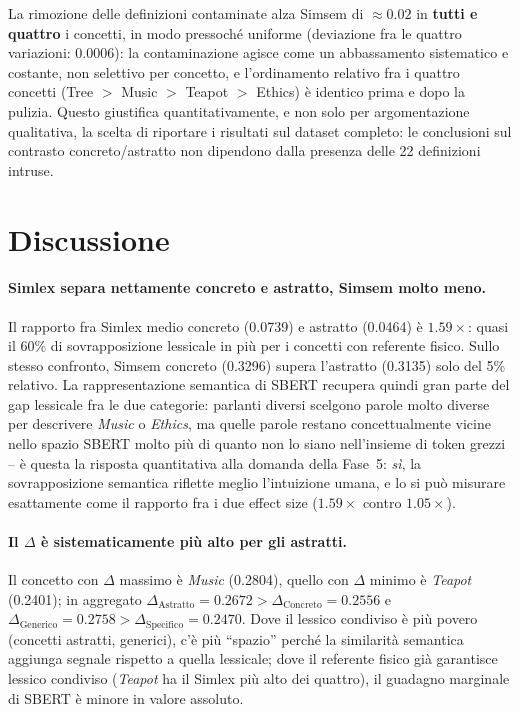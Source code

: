 \documentclass[12pt,a4paper]{article}
\begin{document}
La rimozione delle definizioni contaminate alza Simsem di $\approx 0.02$ in \textbf{tutti e quattro} i concetti, in modo pressoch\'e uniforme (deviazione fra le quattro variazioni: $0.0006$): la contaminazione agisce come un abbassamento sistematico e costante, non selettivo per concetto, e l'ordinamento relativo fra i quattro concetti (Tree $>$ Music $>$ Teapot $>$ Ethics) \`e identico prima e dopo la pulizia. Questo giustifica quantitativamente, e non solo per argomentazione qualitativa, la scelta di riportare i risultati sul dataset completo: le conclusioni sul contrasto concreto/astratto non dipendono dalla presenza delle 22 definizioni intruse.

\section{Discussione}

\paragraph{Simlex separa nettamente concreto e astratto, Simsem molto meno.} Il rapporto fra Simlex medio concreto (0.0739) e astratto (0.0464) \`e $1.59\times$: quasi il 60\% di sovrapposizione lessicale in pi\`u per i concetti con referente fisico. Sullo stesso confronto, Simsem concreto (0.3296) supera l'astratto (0.3135) solo del 5\% relativo. La rappresentazione semantica di SBERT recupera quindi gran parte del gap lessicale fra le due categorie: parlanti diversi scelgono parole molto diverse per descrivere \textit{Music} o \textit{Ethics}, ma quelle parole restano concettualmente vicine nello spazio SBERT molto pi\`u di quanto non lo siano nell'insieme di token grezzi -- \`e questa la risposta quantitativa alla domanda della Fase~5: \emph{s\`i}, la sovrapposizione semantica riflette meglio l'intuizione umana, e lo si pu\`o misurare esattamente come il rapporto fra i due effect size ($1.59\times$ contro $1.05\times$).

\paragraph{Il $\Delta$ \`e sistematicamente pi\`u alto per gli astratti.} Il concetto con $\Delta$ massimo \`e \textit{Music} (0.2804), quello con $\Delta$ minimo \`e \textit{Teapot} (0.2401); in aggregato $\Delta_{\text{Astratto}}=0.2672 > \Delta_{\text{Concreto}}=0.2556$ e $\Delta_{\text{Generico}}=0.2758 > \Delta_{\text{Specifico}}=0.2470$. Dove il lessico condiviso \`e pi\`u povero (concetti astratti, generici), c'\`e pi\`u ``spazio'' perch\'e la similarit\`a semantica aggiunga segnale rispetto a quella lessicale; dove il referente fisico gi\`a garantisce lessico condiviso (\textit{Teapot} ha il Simlex pi\`u alto dei quattro), il guadagno marginale di SBERT \`e minore in valore assoluto.
\end{document}
